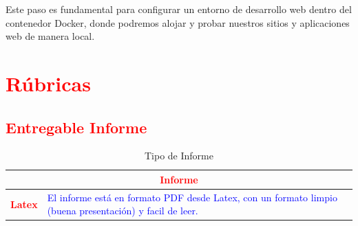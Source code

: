 \documentclass{article}
\begin{document}
Este paso es fundamental para configurar un entorno de desarrollo web dentro del contenedor Docker, donde podremos alojar y probar nuestros sitios y aplicaciones web de manera local.















	\section{\textcolor{red}{Rúbricas}}
	
	\subsection{\textcolor{red}{Entregable Informe}}
	\begin{table}[H]
		\caption{Tipo de Informe}
		\setlength{\tabcolsep}{0.5em} %
		{\renewcommand{\arraystretch}{1.5}%
		\begin{tabular}{|p{3cm}|p{12cm}|}
			\hline
			\multicolumn{2}{|c|}{\textbf{\textcolor{red}{Informe}}}  \\
			\hline 
			\textbf{\textcolor{red}{Latex}} & \textcolor{blue}{El informe está en formato PDF desde Latex,  con un formato limpio (buena presentación) y facil de leer.}   \\ 
			\hline 
			
			
		\end{tabular}
	}
	\end{table}
\end{document}
